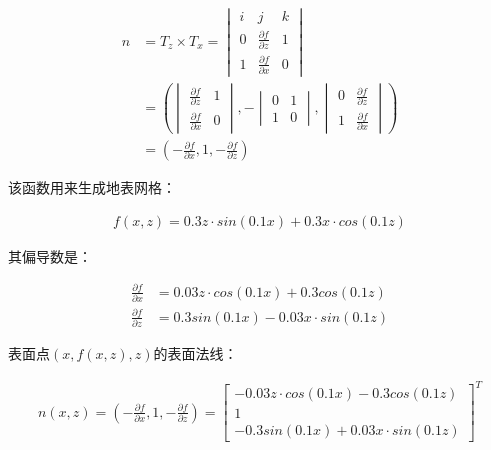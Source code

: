 \begin{align*}
n&=T_{z}\times T_{x}=
\begin{vmatrix}
i & j & k\\ 
0 & \frac{\partial f}{\partial z} & 1\\ 
1 & \frac{\partial f}{\partial x} & 0
\end{vmatrix}\\
&=\left (\begin{vmatrix}
\frac{\partial f}{\partial z} & 1\\ 
\frac{\partial f}{\partial x} & 0
\end{vmatrix},-\begin{vmatrix}
0 & 1\\ 
1 & 0
\end{vmatrix},\begin{vmatrix}
0 & \frac{\partial f}{\partial z}\\ 
1 & \frac{\partial f}{\partial x}
\end{vmatrix}\right )\\
&=\left (-\frac{\partial f}{\partial x},1, -\frac{\partial f}{\partial z}\right )
\end{align*}

\begin{flushleft}
该函数用来生成地表网格：\\
\end{flushleft}

\begin{align*}
f(x,z)=0.3z\cdot sin(0.1x)+0.3x\cdot cos(0.1z)
\end{align*}

\begin{flushleft}
其偏导数是：\\
\end{flushleft}

\begin{align*}
\frac{\partial f}{\partial x}&=0.03z\cdot cos(0.1x)+0.3cos(0.1z)\\
\frac{\partial f}{\partial z}&=0.3sin(0.1x)-0.03x\cdot sin(0.1z)
\end{align*}

\begin{flushleft}
表面点$(x,f(x,z),z)$的表面法线：\\
\end{flushleft}

\begin{align*}
n(x,z)=\left (-\frac{\partial f}{\partial x},1,-\frac{\partial f}{\partial z}\right )
=\begin{bmatrix}
-0.03z\cdot cos(0.1x)-0.3cos(0.1z)\\ 
1\\ 
-0.3sin(0.1x)+0.03x\cdot sin(0.1z)
\end{bmatrix}^{T}
\end{align*}

